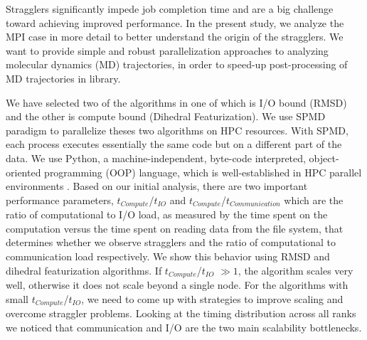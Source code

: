 Stragglers significantly impede job completion time and are a big challenge toward achieving improved performance.
In the present study, we analyze the MPI case in more detail to better understand the origin of the stragglers.
We want to provide simple and robust parallelization approaches to analyzing molecular dynamics (MD) trajectories, in order to speed-up post-processing of MD trajectories in  library. 

We have selected two of the algorithms in  one of which is I/O bound (RMSD) and the other is compute bound (Dihedral Featurization).
We use SPMD paradigm to parallelize theses two algorithms on HPC resources.
With SPMD, each process executes essentially the same code but on a different part of the data. 
We use Python, a machine-independent, byte-code interpreted, object-oriented programming (OOP) language, which is well-established in HPC parallel environments \cite{GAiN}. 
Based on our initial analysis, there are two important performance parameters,  $t_{Compute}$/$t_{IO}$ and $t_{Compute}$/$t_{Communication}$ which are the ratio of computational to I/O load, as measured by the time spent on the computation versus the time spent on reading data from the file system, that determines whether we observe stragglers and the ratio of computational to communication load respectively.
We show this behavior using RMSD and dihedral featurization algorithms.
If $t_{Compute}$/$t_{IO}$  $\gg 1$, the algorithm scales very well, otherwise it does not scale beyond a single node. 
For the algorithms with small $t_{Compute}$/$t_{IO}$, we need to come up with strategies to improve scaling and overcome straggler problems.
Looking at the timing distribution across all ranks we noticed that communication and I/O are the two main scalability bottlenecks.

